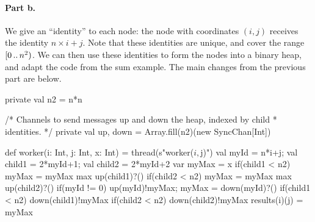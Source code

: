 \begin{answerI}

\paragraph*{Part b.} 

We give an ``identity'' to each node: the node with coordinates $(i,j)$
receives the identity $n \times i + j$.  Note that these identities are
unique, and cover the range $[0 \,..\, n^2)$.  We can then use these
identities to form the nodes into a binary heap, and adapt the code from the
sum example.  The main changes from the previous part are below.
%   
\begin{scala}
  private val n2 = n*n

  /* Channels to send messages up and down the heap, indexed by child
   * identities. */
  private val up, down = Array.fill(n2)(new SyncChan[Int]) 

  def worker(i: Int, j: Int, x: Int) = thread(s"worker($i, $j)"){
    val myId = n*i+j; val child1 = 2*myId+1; val child2 = 2*myId+2
    var myMax = x
    if(child1 < n2) myMax = myMax max up(child1)?()
    if(child2 < n2) myMax = myMax max up(child2)?()
    if(myId != 0){ up(myId)!myMax; myMax = down(myId)?() }
    if(child1 < n2) down(child1)!myMax
    if(child2 < n2) down(child2)!myMax
    results(i)(j) = myMax
  }
\end{scala}
\end{answerI}
